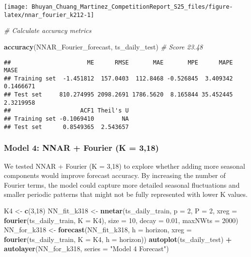 \documentclass[
]{article}
\newenvironment{Shaded}{\begin{snugshade}}{\end{snugshade}}
\newcommand{\AttributeTok}[1]{\textcolor[rgb]{0.13,0.29,0.53}{#1}}
\newcommand{\CommentTok}[1]{\textcolor[rgb]{0.56,0.35,0.01}{\textit{#1}}}
\newcommand{\DecValTok}[1]{\textcolor[rgb]{0.00,0.00,0.81}{#1}}
\newcommand{\FloatTok}[1]{\textcolor[rgb]{0.00,0.00,0.81}{#1}}
\newcommand{\FunctionTok}[1]{\textcolor[rgb]{0.13,0.29,0.53}{\textbf{#1}}}
\newcommand{\NormalTok}[1]{#1}
\newcommand{\OtherTok}[1]{\textcolor[rgb]{0.56,0.35,0.01}{#1}}
\newcommand{\SpecialCharTok}[1]{\textcolor[rgb]{0.81,0.36,0.00}{\textbf{#1}}}
\newcommand{\StringTok}[1]{\textcolor[rgb]{0.31,0.60,0.02}{#1}}
\begin{document}
\begin{center}\texttt{[image: Bhuyan\_Chuang\_Martinez\_CompetitionReport\_S25\_files/figure-latex/nnar\_fourier\_k212-1]} \end{center}

\begin{Shaded}
\begin{Highlighting}[]
\CommentTok{\# Calculate accuracy metrics}

\FunctionTok{accuracy}\NormalTok{(NNAR\_Fourier\_forecast, ts\_daily\_test) }\CommentTok{\# Score 23.48}
\end{Highlighting}
\end{Shaded}

\begin{verbatim}
##                      ME      RMSE       MAE       MPE      MAPE      MASE
## Training set  -1.451812  157.0403  112.8468 -0.526845  3.409342 0.1466671
## Test set     810.274995 2098.2691 1786.5620  8.165844 35.452445 2.3219958
##                    ACF1 Theil's U
## Training set -0.1069410        NA
## Test set      0.8549365  2.543657
\end{verbatim}

\subsubsection{Model 4: NNAR + Fourier (K =
3,18)}\label{model-4-nnar-fourier-k-318}

We tested NNAR + Fourier (K = 3,18) to explore whether adding more
seasonal components would improve forecast accuracy. By increasing the
number of Fourier terms, the model could capture more detailed seasonal
fluctuations and smaller periodic patterns that might not be fully
represented with lower K values.

\begin{Shaded}
\begin{Highlighting}[]
\NormalTok{K4 }\OtherTok{\textless{}{-}} \FunctionTok{c}\NormalTok{(}\DecValTok{3}\NormalTok{,}\DecValTok{18}\NormalTok{)}
\NormalTok{NN\_fit\_k318 }\OtherTok{\textless{}{-}} \FunctionTok{nnetar}\NormalTok{(ts\_daily\_train, }\AttributeTok{p =} \DecValTok{2}\NormalTok{, }\AttributeTok{P =} \DecValTok{2}\NormalTok{, }\AttributeTok{xreg =} \FunctionTok{fourier}\NormalTok{(ts\_daily\_train, }\AttributeTok{K =}\NormalTok{ K4), }\AttributeTok{size =} \DecValTok{10}\NormalTok{, }\AttributeTok{decay =} \FloatTok{0.01}\NormalTok{, }\AttributeTok{maxNWts =} \DecValTok{2000}\NormalTok{)}
\NormalTok{NN\_for\_k318 }\OtherTok{\textless{}{-}} \FunctionTok{forecast}\NormalTok{(NN\_fit\_k318, }\AttributeTok{h =}\NormalTok{ horizon, }\AttributeTok{xreg =} \FunctionTok{fourier}\NormalTok{(ts\_daily\_train, }\AttributeTok{K =}\NormalTok{ K4, }\AttributeTok{h =}\NormalTok{ horizon))}
\FunctionTok{autoplot}\NormalTok{(ts\_daily\_test) }\SpecialCharTok{+} \FunctionTok{autolayer}\NormalTok{(NN\_for\_k318, }\AttributeTok{series =} \StringTok{"Model 4 Forecast"}\NormalTok{)}
\end{Highlighting}
\end{Shaded}
\end{document}
